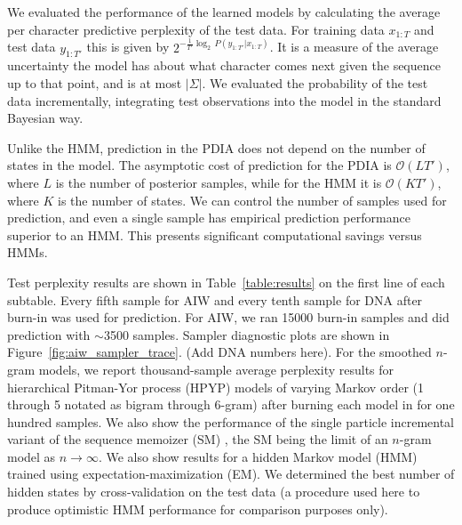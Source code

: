 We evaluated the performance of the learned models by calculating the average per character predictive perplexity of the test data.  For training data $x_{1:T}$ and test data $y_{1:T'}$ this is given by $2^{-\frac{1}{T'}\log_2\, P(y_{1:T'}|x_{1:T})}$.  It is a measure of the average uncertainty the model has about what character comes next given the sequence up to that point, and is at most $|\Sigma|$.  We evaluated the probability of the test data incrementally, integrating test observations into the model in the standard Bayesian way.  

Unlike the HMM, prediction in the PDIA does not depend on the number of states in the model.  The asymptotic cost of prediction for the PDIA is $\mathcal{O}(LT')$, where $L$ is the number of posterior samples, while for the HMM it is $\mathcal{O}(KT')$, where $K$ is the number of states.  We can control the number of samples used for prediction, and even a single sample has empirical prediction performance superior to an HMM.  This presents significant computational savings versus HMMs.%

Test perplexity results are shown in Table~\ref{table:results} on the first line of each subtable.  Every fifth sample for AIW and every tenth sample for DNA after burn-in was used for prediction.  For AIW, we ran 15000 burn-in samples and did prediction with $\sim$3500 samples.  Sampler diagnostic plots are shown in Figure~\ref{fig:aiw_sampler_trace}.  (Add DNA numbers here).
For the smoothed $n$-gram models, we report thousand-sample average perplexity results for hierarchical Pitman-Yor process (HPYP) \cite{Teh2006a} models of varying Markov order (1 through 5 notated as bigram through 6-gram) after burning each model in for one hundred samples.  We also show the performance of the single particle incremental variant of the sequence memoizer (SM) \cite{Gasthaus2010}, the SM being the limit of an $n$-gram model as $n\rightarrow\infty$.
We also show results for a hidden Markov model (HMM) \cite{Murphy2005} trained using expectation-maximization (EM).  We determined the best number of hidden states by cross-validation on the test data (a procedure used here to produce optimistic HMM performance for comparison purposes only).  

